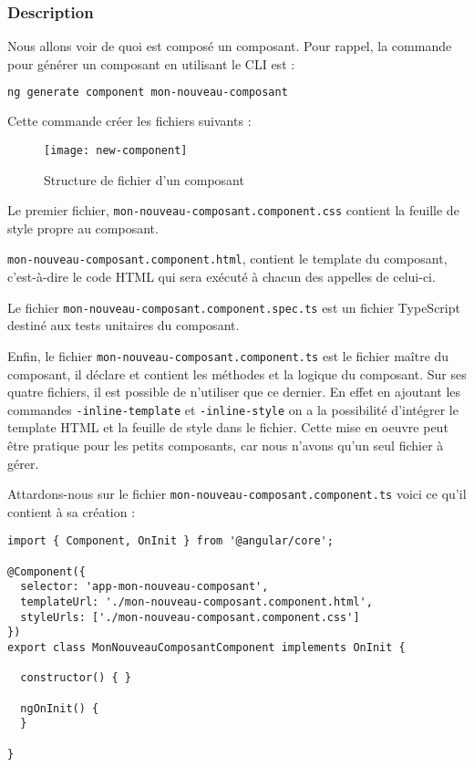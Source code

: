 \subsubsection{Description}
Nous allons voir de quoi est composé un composant. Pour rappel, la commande pour générer un composant en utilisant le CLI est :
\begin{lstlisting}[language=bash]
ng generate component mon-nouveau-composant
\end{lstlisting}
Cette commande créer les fichiers suivants :
\begin{figure}[h]
	\centering
	\texttt{[image: new-component]}
	\caption{Structure de fichier d'un composant}
	\label{new-component}
\end{figure}


Le premier fichier, \texttt{mon-nouveau-composant.component.css} contient la feuille de style propre au composant.

\texttt{mon-nouveau-composant.component.html}, contient le template du composant, c'est-à-dire le code HTML qui sera exécuté à chacun des appelles de celui-ci. 

Le fichier \texttt{mon-nouveau-composant.component.spec.ts} est un fichier TypeScript destiné aux tests unitaires du composant. 

Enfin, le fichier \texttt{mon-nouveau-composant.component.ts} est le fichier maître du composant, il déclare et contient les méthodes et la logique du composant. Sur ses quatre fichiers, il est possible de n'utiliser que ce dernier. En effet en ajoutant les commandes \texttt{-inline-template} et \texttt{-inline-style}\cite{angluarcli:doc} on a la possibilité d'intégrer le template HTML et la feuille de style dans le fichier. Cette mise en oeuvre peut être pratique pour les petits composants, car nous n'avons qu'un seul fichier à gérer.

Attardons-nous sur le fichier \texttt{mon-nouveau-composant.component.ts} voici ce qu'il contient à sa création :

\begin{lstlisting}[style=htmlcssjs, caption={mon-nouveau-composant.component.ts}, label=composant]
import { Component, OnInit } from '@angular/core';

@Component({
  selector: 'app-mon-nouveau-composant',
  templateUrl: './mon-nouveau-composant.component.html',
  styleUrls: ['./mon-nouveau-composant.component.css']
})
export class MonNouveauComposantComponent implements OnInit {

  constructor() { }

  ngOnInit() {
  }

}
\end{lstlisting}

